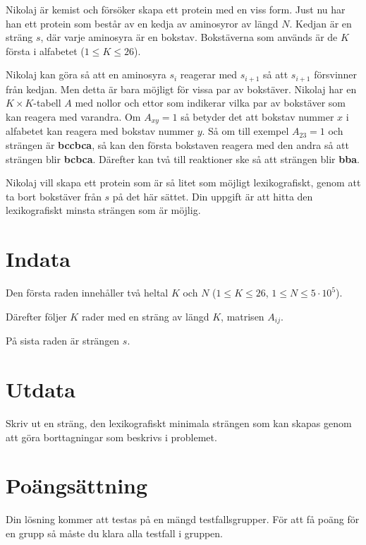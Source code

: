 
Nikolaj är kemist och försöker skapa ett protein med en viss form. Just nu har han ett protein
som består av en kedja av aminosyror av längd $N$. Kedjan är en sträng $s$, där 
varje aminosyra är en bokstav.
Bokstäverna som används är de $K$ första i alfabetet ($1 \leq K \leq 26$).

Nikolaj kan göra så att en aminosyra $s_i$ reagerar med $s_{i+1}$ så att $s_{i+1}$ försvinner 
från kedjan. Men detta är bara möjligt för vissa par av bokstäver. Nikolaj har en $K \times K$-tabell
$A$ med nollor och ettor som indikerar vilka par av bokstäver som kan reagera med varandra. 
Om $A_{xy} = 1$ så betyder det att bokstav nummer $x$ i alfabetet kan reagera med bokstav nummer $y$.
Så om till exempel $A_{23} = 1$ och strängen är \textbf{bccbca}, så kan den första bokstaven reagera
med den andra så att strängen blir \textbf{bcbca}. Därefter kan två till reaktioner ske så
att strängen blir \textbf{bba}.  

Nikolaj vill skapa ett protein som är så litet som möjligt lexikografiskt, genom att ta bort 
bokstäver från $s$ på det här sättet. Din uppgift är att hitta den lexikografiskt minsta
strängen som är möjlig.

\section*{Indata}

Den första raden innehåller två heltal $K$ och $N$ ($1 \leq K \leq 26$, $1 \leq N \leq 5 \cdot 10^5$).

Därefter följer $K$ rader med en sträng av längd $K$, matrisen $A_{ij}$.

På sista raden är strängen $s$.

\section*{Utdata}
Skriv ut en sträng, den lexikografiskt minimala strängen som kan skapas genom att göra borttagningar
som beskrivs i problemet.

\section*{Poängsättning}
Din lösning kommer att testas på en mängd testfallsgrupper.
För att få poäng för en grupp så måste du klara alla testfall i gruppen.

